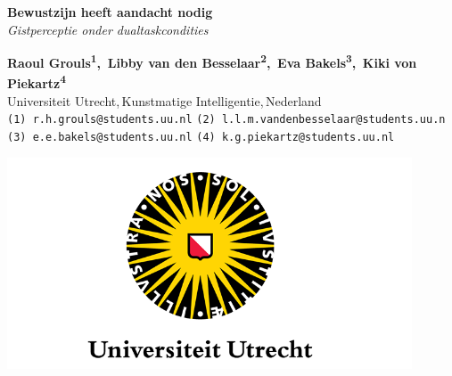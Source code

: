 \documentclass[a0,portrait]{a0poster}
\begin{document}


\begin{minipage}[b]{0.4\linewidth}
\Huge \color{NavyBlue} \textbf{Bewustzijn heeft aandacht nodig}\\ \color{Black} %
\Large\textit{Gistperceptie onder dualtaskcondities}\\ %
\end{minipage}
\begin{minipage}{0.4\linewidth}
\normalsize \textbf{Raoul Grouls\textsuperscript{1},
	\,Libby van den Besselaar\textsuperscript{2},
	\,Eva Bakels\textsuperscript{3},
	\,Kiki von Piekartz\textsuperscript{4}}\\ %
\small Universiteit Utrecht,\,Kunstmatige Intelligentie,\,Nederland \\%
\small \texttt{(1) r.h.grouls@students.uu.nl}
\texttt{(2) l.l.m.vandenbesselaar@students.uu.n}\\
\texttt{(3) e.e.bakels@students.uu.nl}
\texttt{(4) k.g.piekartz@students.uu.nl}
\end{minipage}
\begin{minipage}[b]{0.2\linewidth}
\includegraphics[width=12cm]{uu-logo.png} 
\end{minipage}

\vspace{1cm} %
\end{document}
